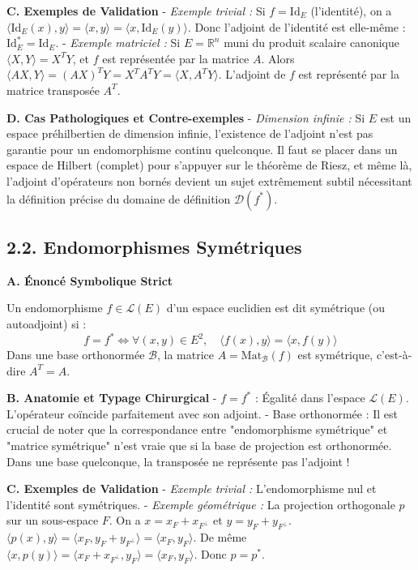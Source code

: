 \documentclass[11pt,a4paper]{article}
\begin{document}
\textbf{C. Exemples de Validation}
- \textit{Exemple trivial :} Si $f = \text{Id}_E$ (l'identité), on a $\langle \text{Id}_E(x), y \rangle = \langle x, y \rangle = \langle x, \text{Id}_E(y) \rangle$. Donc l'adjoint de l'identité est elle-même : $\text{Id}_E^* = \text{Id}_E$.
- \textit{Exemple matriciel :} Si $E = \mathbb{R}^n$ muni du produit scalaire canonique $\langle X, Y \rangle = X^T Y$, et $f$ est représentée par la matrice $A$. Alors $\langle AX, Y \rangle = (AX)^T Y = X^T A^T Y = \langle X, A^T Y \rangle$. L'adjoint de $f$ est représenté par la matrice transposée $A^T$.

\textbf{D. Cas Pathologiques et Contre-exemples}
- \textit{Dimension infinie :} Si $E$ est un espace préhilbertien de dimension infinie, l'existence de l'adjoint n'est pas garantie pour un endomorphisme continu quelconque. Il faut se placer dans un espace de Hilbert (complet) pour s'appuyer sur le théorème de Riesz, et même là, l'adjoint d'opérateurs non bornés devient un sujet extrêmement subtil nécessitant la définition précise du domaine de définition $\mathcal{D}(f^*)$.

\subsection{2.2. Endomorphismes Symétriques}

\textbf{A. Énoncé Symbolique Strict}

Un endomorphisme $f \in \mathcal{L}(E)$ d'un espace euclidien est dit symétrique (ou autoadjoint) si :
$$ f = f^* \iff \forall (x,y) \in E^2, \quad \langle f(x), y \rangle = \langle x, f(y) \rangle $$
Dans une base orthonormée $\mathcal{B}$, la matrice $A = \text{Mat}_{\mathcal{B}}(f)$ est symétrique, c'est-à-dire $A^T = A$.

\textbf{B. Anatomie et Typage Chirurgical}
- $f = f^*$ : Égalité dans l'espace $\mathcal{L}(E)$. L'opérateur coïncide parfaitement avec son adjoint.
- Base orthonormée : Il est crucial de noter que la correspondance entre "endomorphisme symétrique" et "matrice symétrique" n'est vraie que si la base de projection est orthonormée. Dans une base quelconque, la transposée ne représente pas l'adjoint !

\textbf{C. Exemples de Validation}
- \textit{Exemple trivial :} L'endomorphisme nul et l'identité sont symétriques.
- \textit{Exemple géométrique :} La projection orthogonale $p$ sur un sous-espace $F$. On a $x = x_F + x_{F^\perp}$ et $y = y_F + y_{F^\perp}$.
$\langle p(x), y \rangle = \langle x_F, y_F + y_{F^\perp} \rangle = \langle x_F, y_F \rangle$.
De même $\langle x, p(y) \rangle = \langle x_F + x_{F^\perp}, y_F \rangle = \langle x_F, y_F \rangle$. Donc $p = p^*$.
\end{document}
